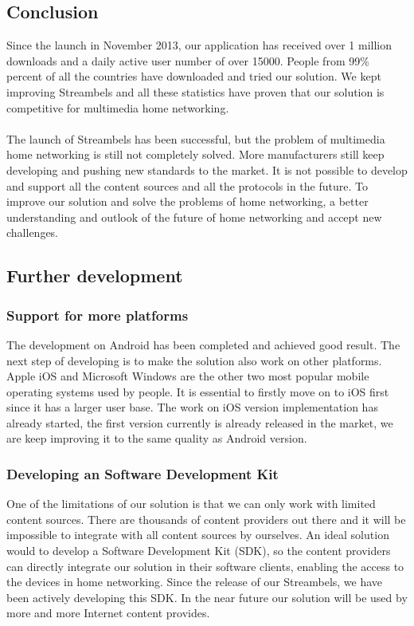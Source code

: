 \subsection{Conclusion}
Since the launch in November 2013, our application has received over 1 million
downloads and a daily active user number of over 15000. People from 99\% percent
of all the countries have downloaded and tried our solution. We kept improving
Streambels and all these statistics have proven that our solution is competitive for multimedia home networking.\\
\\
The launch of Streambels has been successful, but the problem of multimedia
 home networking is still not completely solved. More manufacturers still keep developing and pushing new standards to the market. It is not possible to develop and support all the content sources and all the protocols in the future. To improve our solution and solve the problems of home networking, a better understanding and outlook of the future of home networking and accept new challenges.

\subsection{Further development}
\subsubsection{Support for more platforms}
The development on Android has been completed and achieved good result. The next step of developing is to make the solution also work on other platforms. Apple iOS and Microsoft Windows are the other two most popular mobile operating systems used by people. It is essential to firstly move on to iOS first since it has a larger user base. The work on iOS version implementation has already started, the first version currently is already released in the market, we are keep improving it to the same quality as Android version.
\subsubsection{Developing an Software Development Kit}
One of the limitations of our solution is that we can only work with limited content sources. There are thousands of content providers out there and it will be impossible to integrate with all content sources by ourselves. An ideal solution would to develop a Software Development Kit (SDK), so the content providers can directly integrate our solution in their software clients, enabling the access to the devices in home networking. Since the release of our Streambels, we have been actively developing this SDK. In the near future our solution will be used by more and more Internet content provides.
